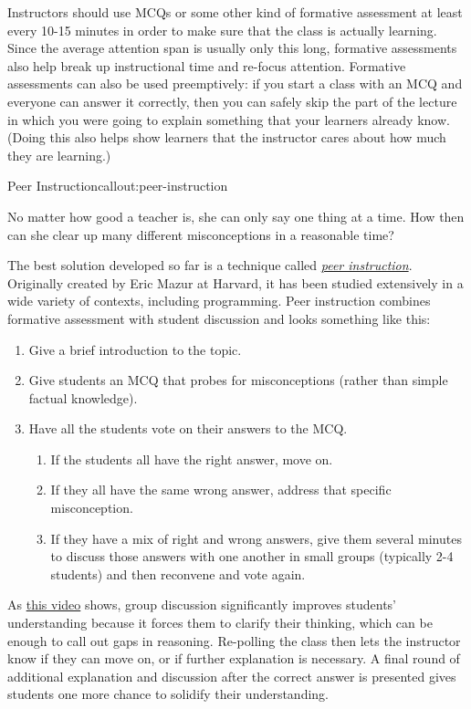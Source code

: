 Instructors should use MCQs or some other kind of formative assessment
at least every 10-15 minutes in order to make sure that the class is
actually learning. Since the average attention span is usually only this
long, formative assessments also help break up instructional time and
re-focus attention. Formative assessments can also be used preemptively:
if you start a class with an MCQ and everyone can answer it correctly,
then you can safely skip the part of the lecture in which you were going
to explain something that your learners already know. (Doing this also
helps show learners that the instructor cares about how much they are
learning.)

\begin{callout}{Peer Instruction}{callout:peer-instruction}

No matter how good a teacher is, she can only say one thing at a time.
How then can she clear up many different misconceptions in a reasonable
time?

The best solution developed so far is a technique called
\emph{\href{https://en.wikipedia.org/wiki/Peer\_instruction}{peer
instruction}}. Originally created by Eric Mazur at Harvard, it has been
studied extensively in a wide variety of contexts, including
programming. Peer instruction combines formative assessment with student
discussion and looks something like this:

\begin{enumerate}
\item
  Give a brief introduction to the topic.
\item
  Give students an MCQ that probes for misconceptions (rather than
  simple factual knowledge).
\item
  Have all the students vote on their answers to the MCQ.

  \begin{enumerate}
    \item
    If the students all have the right answer, move on.
  \item
    If they all have the same wrong answer, address that specific
    misconception.
  \item
    If they have a mix of right and wrong answers, give them several
    minutes to discuss those answers with one another in small groups
    (typically 2-4 students) and then reconvene and vote again.
  \end{enumerate}
\end{enumerate}

As \href{https://www.youtube.com/watch?t=1\&v=2LbuoxAy56o}{this video}
shows, group discussion significantly improves students' understanding
because it forces them to clarify their thinking, which can be enough to
call out gaps in reasoning. Re-polling the class then lets the
instructor know if they can move on, or if further explanation is
necessary. A final round of additional explanation and discussion after
the correct answer is presented gives students one more chance to
solidify their understanding.


\end{callout}
